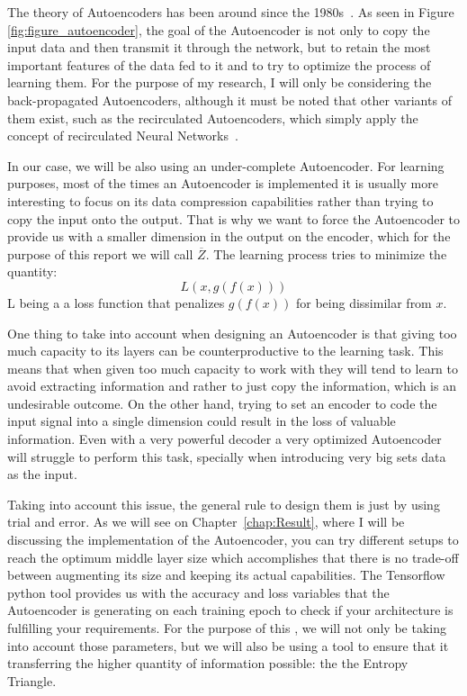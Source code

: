 The theory of Autoencoders has been around since the 1980s~\cite{Autoencoders_first_mention}. As seen in Figure \ref{fig:figure_autoencoder}, the goal of the Autoencoder is not only to copy the input data and then transmit it through the network, but to retain the most important features of the data fed to it and to try to optimize the process of learning them. For the purpose of my research, I will only be considering the back-propagated Autoencoders, although it must be noted that other variants of them exist, such as the recirculated Autoencoders, which simply apply the concept of recirculated Neural Networks~\cite{Recirculated_NN}. \par

In our case, we will be also using an under-complete Autoencoder. For learning purposes, most of the times an Autoencoder is implemented it is usually more interesting to focus on its data compression capabilities rather than trying to copy the input onto the output. That is why we want to force the Autoencoder to provide us with a smaller dimension in the output on the encoder, which for the purpose of this report we will call $\overline Z$. The learning process tries to minimize the quantity: 
%
\begin{equation}
L(x,g(f(x)))
\end{equation}
L being a a loss function that penalizes $g(f(x))$ for being dissimilar from $x$.

One thing to take into account when designing an Autoencoder is that giving too much capacity to its layers can be counterproductive to the learning task. This means that when given too much capacity to work with they will tend to learn to avoid extracting information and rather to just copy the information, which is an undesirable outcome. On the other hand, trying to set an encoder to code the input signal into a single dimension could result in the loss of valuable information. Even with a very powerful decoder a very optimized Autoencoder will struggle to perform this task, specially when introducing very big sets data as the input. \par

Taking into account this issue, the general rule to design them is just by using trial and error. As we will see on Chapter~\ref{chap:Result}, where I will be discussing the implementation of the Autoencoder, you can try different setups to reach the optimum middle layer size which accomplishes that there is no trade-off between augmenting its size and keeping its actual capabilities. The Tensorflow python tool provides us with the accuracy and loss variables that the Autoencoder is generating on each training epoch to check if your architecture is fulfilling your requirements. For the purpose of this \bth, we will not only be taking into account those parameters, but we will also be using a tool to ensure that it transferring the higher quantity of information possible: the {the Entropy Triangle}.

